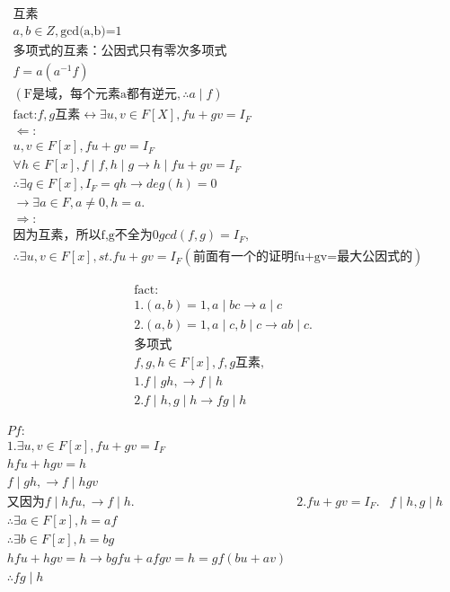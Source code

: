 \documentclass[12pt, a4paper]{article}  %
\begin{document}
\begin{align}
    &\text{互素}\\
    &a,b\in Z,\text{gcd(a,b)=1}\\
    &\text{多项式的互素：公因式只有零次多项式}\\
    &f=a(a^{-1}f)\\
    &(\text{F是域，每个元素a都有逆元},\therefore a\mid f)\\
    &\text{fact:}f,g\text{互素}\leftrightarrow \exists u,v\in F[X],fu+gv=I_F\\
    &\Leftarrow:\\
    & u,v\in F[x],fu+gv=I_F\\
    &\forall h\in F[x],f\mid f,h\mid g\rightarrow h\mid fu+gv=I_F\\
    &\therefore \exists q\in F[x],I_F=qh\rightarrow deg(h)=0\\
    &\rightarrow \exists a\in F,a\neq 0,h=a.
    & \\
    &\Rightarrow: \\
    &\text{因为互素，所以f,g不全为0}gcd(f,g)=I_F,\\
    &\therefore \exists u,v\in F[x],st. fu+gv=I_F(\text{前面有一个的证明fu+gv=最大公因式的})
\end{align}

\begin{align}
    &\text{fact:}\\
    &1.(a,b)=1, a\mid bc\rightarrow a\mid c\\
    &2.(a,b)=1,a\mid c,b\mid c\rightarrow ab\mid c.\\
    &\text{多项式}\\
    &f,g,h\in F[x],f,g\text{互素},\\
    &1.f\mid gh,\rightarrow f\mid h\\
    &2.f\mid h,g\mid h\rightarrow fg\mid h
\end{align}

\begin{align}
    &Pf:\\
    &1.\exists u,v\in F[x],fu+gv=I_F\\
    &hfu+hgv=h\\
    &f\mid gh,\rightarrow f\mid hgv\\
    &\text{又因为}f\mid hfu,\rightarrow f\mid h.
    &2.fu+gv=I_F.
    & f\mid h,g\mid h\\
    & \therefore \exists a\in F[x],h=af\\
    &\therefore \exists b\in F[x],h=bg\\
    &hfu+hgv=h\rightarrow bgfu+afgv=h=gf(bu+av)\\
    &\therefore fg\mid h
\end{align}
\end{document}
